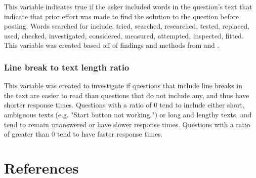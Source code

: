 \documentclass[preprint]{elsarticle}
\begin{document}
This variable indicates true if the asker included words in the question's text that indicate that prior effort was made to find the solution to the question before posting. Words searched for include: tried, searched, researched, tested, replaced, used, checked, investigated, considered, measured, attempted, inspected, fitted. This variable was created based off of findings and methods from \citep{Bhat2014} and \citep{Harper2008}. 


\subsubsection{Line break to text length ratio}

This variable was created to investigate if questions that include line breaks in the text are easier to read than questions that do not include any, and thus have shorter response times. Questions with a ratio of 0 tend to include either short, ambiguous texts (e.g. "Start button not working.") or long and lengthy texts, and tend to remain unanswered or have slower response times. Questions with a ratio of greater than 0 tend to have faster response times. 


\section*{References}



\end{document}
